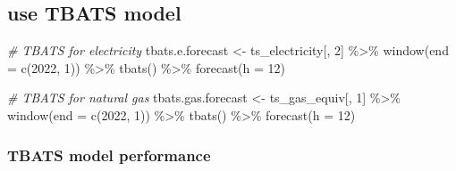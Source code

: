 \documentclass[
]{article}
\newenvironment{Shaded}{\begin{snugshade}}{\end{snugshade}}
\newcommand{\AttributeTok}[1]{\textcolor[rgb]{0.77,0.63,0.00}{#1}}
\newcommand{\CommentTok}[1]{\textcolor[rgb]{0.56,0.35,0.01}{\textit{#1}}}
\newcommand{\DecValTok}[1]{\textcolor[rgb]{0.00,0.00,0.81}{#1}}
\newcommand{\FunctionTok}[1]{\textcolor[rgb]{0.00,0.00,0.00}{#1}}
\newcommand{\NormalTok}[1]{#1}
\newcommand{\OtherTok}[1]{\textcolor[rgb]{0.56,0.35,0.01}{#1}}
\newcommand{\SpecialCharTok}[1]{\textcolor[rgb]{0.00,0.00,0.00}{#1}}
\begin{document}
\hypertarget{use-tbats-model}{%
\subsection{use TBATS model}\label{use-tbats-model}}

\begin{Shaded}
\begin{Highlighting}[]
\CommentTok{\# TBATS for electricity}
\NormalTok{tbats.e.forecast }\OtherTok{\textless{}{-}}\NormalTok{ ts\_electricity[, }\DecValTok{2}\NormalTok{] }\SpecialCharTok{\%\textgreater{}\%} 
  \FunctionTok{window}\NormalTok{(}\AttributeTok{end =} \FunctionTok{c}\NormalTok{(}\DecValTok{2022}\NormalTok{, }\DecValTok{1}\NormalTok{)) }\SpecialCharTok{\%\textgreater{}\%} 
  \FunctionTok{tbats}\NormalTok{() }\SpecialCharTok{\%\textgreater{}\%} 
  \FunctionTok{forecast}\NormalTok{(}\AttributeTok{h =} \DecValTok{12}\NormalTok{)}

\CommentTok{\# TBATS for natural gas}
\NormalTok{tbats.gas.forecast }\OtherTok{\textless{}{-}}\NormalTok{ ts\_gas\_equiv[, }\DecValTok{1}\NormalTok{] }\SpecialCharTok{\%\textgreater{}\%} 
  \FunctionTok{window}\NormalTok{(}\AttributeTok{end =} \FunctionTok{c}\NormalTok{(}\DecValTok{2022}\NormalTok{, }\DecValTok{1}\NormalTok{)) }\SpecialCharTok{\%\textgreater{}\%} 
  \FunctionTok{tbats}\NormalTok{() }\SpecialCharTok{\%\textgreater{}\%} 
  \FunctionTok{forecast}\NormalTok{(}\AttributeTok{h =} \DecValTok{12}\NormalTok{)}
\end{Highlighting}
\end{Shaded}

\hypertarget{tbats-model-performance}{%
\subsubsection{TBATS model performance}\label{tbats-model-performance}}

\begin{Shaded}
\end{Shaded}
\end{document}
